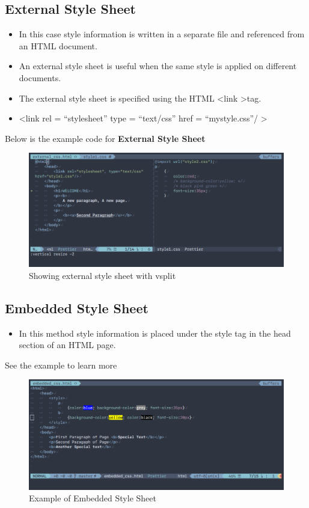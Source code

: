 \documentclass[a4paper,1pt,oneside]{article}
\begin{document}
\subsection{External Style Sheet}

\begin{itemize}
	\item In this case style information is written in a separate file and referenced from an HTML document.
	\item An external style sheet is useful when the same style is applied on different documents.
	\item The external style sheet is specified using the HTML \textless link \textgreater tag.
	\item \textless link rel = ``stylesheet'' type = ``text/css'' href = ``mystyle.css''/ \textgreater
\end{itemize}

Below is the example code for \textbf{External Style Sheet}

\begin{figure}[hbt!]
	\centering
	\includegraphics[width=1\textwidth]{images/2020-03-23-224542_996x446_scrot.png}
	\caption{Showing external style sheet with vsplit}
\end{figure}

\subsection{Embedded Style Sheet}

\begin{itemize}
	\item In this method style information is placed under the style tag in the head section of an HTML page.
\end{itemize}

See the example to learn more

\begin{figure}[hbt!]
	\centering
	\includegraphics[width=1\textwidth]{images/2020-03-23-224635_996x431_scrot.png}
	\caption{Example of Embedded Style Sheet}
\end{figure}
\end{document}

